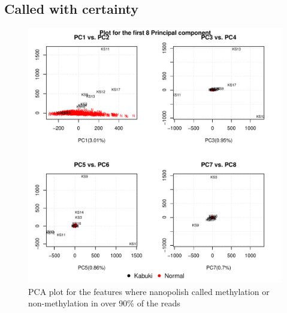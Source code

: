 \subsection{Called with certainty}

\begin{figure}[!h]
    \centering
    \includegraphics[width=\textwidth]{figures/PCA/certain/pca_plot_label.pdf}
    \caption{PCA plot for the features where nanopolish called methylation or non-methylation in over 90\% of the reads}
    \label{fig:certain-PCA}
\end{figure}

